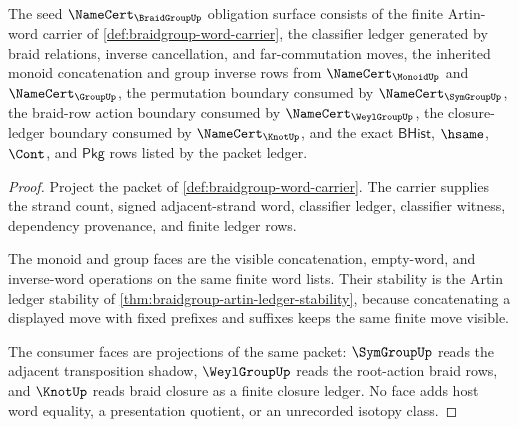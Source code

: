 \begin{theorem}
\label{thm:braidgroup-namecert-obligation-surface}
The seed $\NameCert_{\BraidGroupUp}$ obligation surface consists of the finite Artin-word carrier of \autoref{def:braidgroup-word-carrier}, the classifier ledger generated by braid relations, inverse cancellation, and far-commutation moves, the inherited monoid concatenation and group inverse rows from $\NameCert_{\MonoidUp}$ and $\NameCert_{\GroupUp}$, the permutation boundary consumed by $\NameCert_{\SymGroupUp}$, the braid-row action boundary consumed by $\NameCert_{\WeylGroupUp}$, the closure-ledger boundary consumed by $\NameCert_{\KnotUp}$, and the exact $\mathsf{BHist}$, $\hsame$, $\Cont$, and $\mathsf{Pkg}$ rows listed by the packet ledger.
\end{theorem}
\begin{proof}
Project the packet of \autoref{def:braidgroup-word-carrier}. The carrier supplies the strand count, signed adjacent-strand word, classifier ledger, classifier witness, dependency provenance, and finite ledger rows.

The monoid and group faces are the visible concatenation, empty-word, and inverse-word operations on the same finite word lists. Their stability is the Artin ledger stability of \autoref{thm:braidgroup-artin-ledger-stability}, because concatenating a displayed move with fixed prefixes and suffixes keeps the same finite move visible.

The consumer faces are projections of the same packet: $\SymGroupUp$ reads the adjacent transposition shadow, $\WeylGroupUp$ reads the root-action braid rows, and $\KnotUp$ reads braid closure as a finite closure ledger. No face adds host word equality, a presentation quotient, or an unrecorded isotopy class.
\end{proof}

